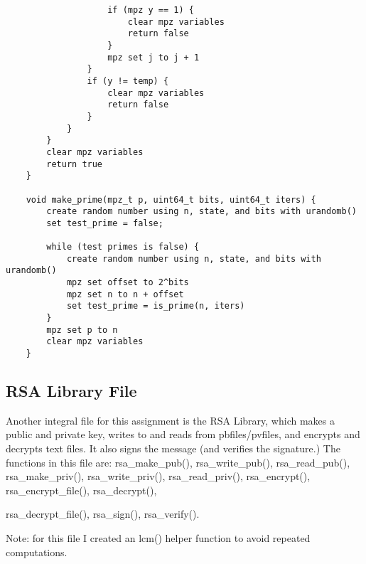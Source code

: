 \documentclass[11pt]{article}
\begin{document}
\begin{verbatim}
					if (mpz y == 1) {
						clear mpz variables
						return false
					}
					mpz set j to j + 1
				}
				if (y != temp) {
					clear mpz variables
					return false
				}
			}
		}
		clear mpz variables
		return true
	}

	void make_prime(mpz_t p, uint64_t bits, uint64_t iters) {
		create random number using n, state, and bits with urandomb()
		set test_prime = false;

		while (test primes is false) {
			create random number using n, state, and bits with urandomb()
			mpz set offset to 2^bits
			mpz set n to n + offset
			set test_prime = is_prime(n, iters)
		}
		mpz set p to n
		clear mpz variables
	}
\end{verbatim}


\subsection{RSA Library File}

Another integral file for this assignment is the RSA Library, which makes a public and private key, writes 
to and reads from pbfiles/pvfiles, and encrypts and decrypts text files. It also signs the 
message (and verifies the signature.) The functions in this file are: rsa\_make\_pub(),
rsa\_write\_pub(), rsa\_read\_pub(), rsa\_make\_priv(), rsa\_write\_priv(), rsa\_read\_priv(),
rsa\_encrypt(), rsa\_encrypt\_file(), rsa\_decrypt(),       

rsa\_decrypt\_file(), rsa\_sign(), rsa\_verify().

Note: for this file I created an lcm() helper function to avoid repeated computations.
\end{document}
